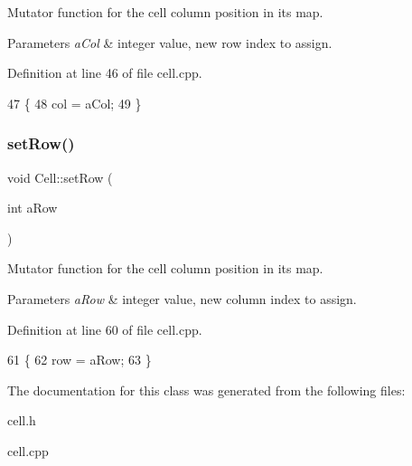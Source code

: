 Mutator function for the cell column position in its map. 
\begin{DoxyParams}{Parameters}
{\em a\+Col} & integer value, new row index to assign. \\
\hline
\end{DoxyParams}


Definition at line 46 of file cell.\+cpp.


\begin{DoxyCode}
47 \{
48     col = aCol;
49 \}
\end{DoxyCode}
\hypertarget{class_cell_abe20d88439c8e1482a207fc1d627d00e}{}\label{class_cell_abe20d88439c8e1482a207fc1d627d00e} 
\subsubsection{\texorpdfstring{set\+Row()}{setRow()}}
{\footnotesize\ttfamily void Cell\+::set\+Row (\begin{DoxyParamCaption}\item[{int}]{a\+Row }\end{DoxyParamCaption})}

Mutator function for the cell column position in its map. 
\begin{DoxyParams}{Parameters}
{\em a\+Row} & integer value, new column index to assign. \\
\hline
\end{DoxyParams}


Definition at line 60 of file cell.\+cpp.


\begin{DoxyCode}
61 \{
62     row = aRow;
63 \}
\end{DoxyCode}


The documentation for this class was generated from the following files\+:\begin{DoxyCompactItemize}
\item 
cell.\+h\item 
cell.\+cpp\end{DoxyCompactItemize}
